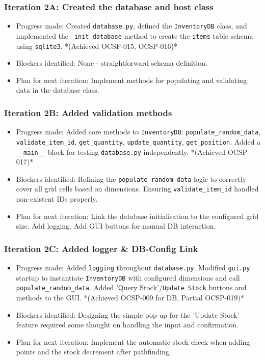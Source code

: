\subsubsection{Iteration 2A: Created the database and host class}
\begin{itemize}
	\item Progress made: Created \verb|database.py|, defined the \verb|InventoryDB| class, and implemented the \verb|_init_database| method to create the \verb|items| table schema using \verb|sqlite3|. *(Achieved OCSP-015, OCSP-016)*
	\item Blockers identified: None - straightforward schema definition.
	\item Plan for next iteration: Implement methods for populating and validating data in the database class.
\end{itemize}

\subsubsection{Iteration 2B: Added validation methods}
\begin{itemize}
	\item Progress made: Added core methods to \verb|InventoryDB|: \verb|populate_random_data|, \verb|validate_item_id|, \verb|get_quantity|, \verb|update_quantity|, \verb|get_position|. Added a \verb|__main__| block for testing \verb|database.py| independently. *(Achieved OCSP-017)*
	\item Blockers identified: Refining the \verb|populate_random_data| logic to correctly cover all grid cells based on dimensions. Ensuring \verb|validate_item_id| handled non-existent IDs properly.
	\item Plan for next iteration: Link the database initialisation to the configured grid size. Add logging. Add GUI buttons for manual DB interaction.
\end{itemize}

\subsubsection{Iteration 2C: Added logger \& DB-Config Link}
\begin{itemize}
	\item Progress made: Added \verb|logging| throughout \verb|database.py|. Modified \verb|gui.py| startup to instantiate \verb|InventoryDB| with configured dimensions and call \verb|populate_random_data|. Added 'Query Stock'/\verb|Update Stock| buttons and methods to the GUI. *(Achieved OCSP-009 for DB, Partial OCSP-019)*
	\item Blockers identified: Designing the simple pop-up for the 'Update Stock' feature required some thought on handling the input and confirmation.
	\item Plan for next iteration: Implement the automatic stock check when adding points and the stock decrement after pathfinding.
\end{itemize}

